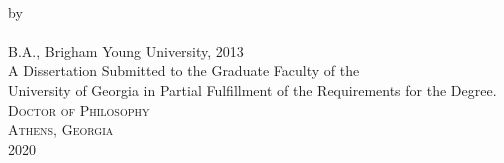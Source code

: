 \setcounter{page}{1}

\vspace*{18pt}
\begin{center}
  \textsc{\dissertationtitle}\\[18pt]
  by\\[12pt]
  \textsc{\myname}\\[8pt]
  B.A., Brigham Young University, 2013\\
  \vfill
  A Dissertation Submitted to the Graduate Faculty of the\\ University of Georgia in Partial Fulfillment of the Requirements for the Degree.\\ [18pt]

  \textsc{Doctor of Philosophy}\\[24pt]
  \textsc{Athens, Georgia}\\[18pt]
  2020
\end{center}
